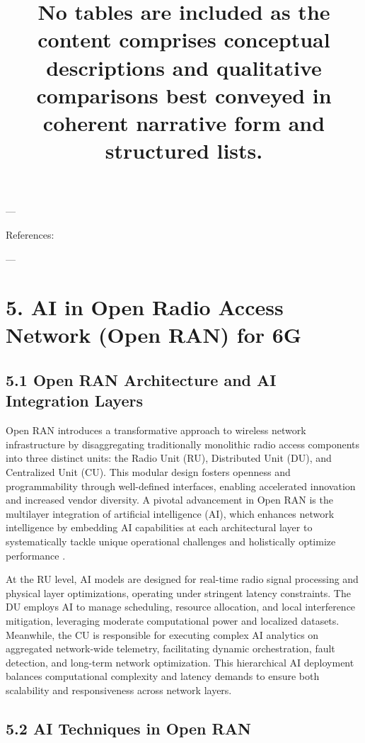 \documentclass[11pt]{article}
\begin{document}
\begin{itemize}
\title{No tables are included as the content comprises conceptual descriptions and qualitative comparisons best conveyed in coherent narrative form and structured lists.}
\maketitle

---

References: \cite{ref4, ref17, ref18, ref19, ref20, ref48, ref49, ref50, ref53}

---

\section{5. AI in Open Radio Access Network (Open RAN) for 6G}

\subsection{5.1 Open RAN Architecture and AI Integration Layers}

Open RAN introduces a transformative approach to wireless network infrastructure by disaggregating traditionally monolithic radio access components into three distinct units: the Radio Unit (RU), Distributed Unit (DU), and Centralized Unit (CU). This modular design fosters openness and programmability through well-defined interfaces, enabling accelerated innovation and increased vendor diversity. A pivotal advancement in Open RAN is the multilayer integration of artificial intelligence (AI), which enhances network intelligence by embedding AI capabilities at each architectural layer to systematically tackle unique operational challenges and holistically optimize performance \cite{ref54}.

At the RU level, AI models are designed for real-time radio signal processing and physical layer optimizations, operating under stringent latency constraints. The DU employs AI to manage scheduling, resource allocation, and local interference mitigation, leveraging moderate computational power and localized datasets. Meanwhile, the CU is responsible for executing complex AI analytics on aggregated network-wide telemetry, facilitating dynamic orchestration, fault detection, and long-term network optimization. This hierarchical AI deployment balances computational complexity and latency demands to ensure both scalability and responsiveness across network layers.

\subsection{5.2 AI Techniques in Open RAN}


\end{itemize}
\end{document}
